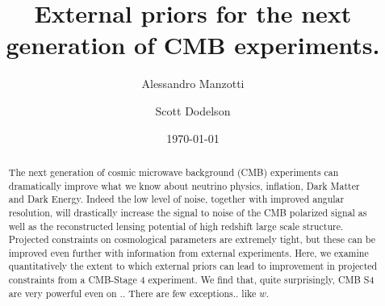 \documentclass[aps,prd,reprint,superscriptaddress]{revtex4-1}
\begin{document}
\graphicspath{{images/}}

\title{External priors for the next generation of CMB experiments.}

\author{Alessandro Manzotti}
\author{Scott Dodelson}


\date{\today}
\begin{abstract}
The next generation of cosmic microwave background (CMB) experiments can dramatically improve what we know about neutrino physics, inflation, Dark Matter and Dark Energy. 
Indeed the low level of noise, together with improved angular resolution, will drastically increase the signal to noise of the CMB polarized signal as well as the reconstructed lensing potential of high redshift large scale structure. 
Projected constraints on cosmological parameters are extremely tight, but these can be improved even further with information from external experiments. Here, we examine quantitatively the extent to which external priors can lead to improvement in projected constraints from a CMB-Stage 4 experiment.
We find that, quite surprisingly, CMB S4 are very powerful even on .. There are few exceptions.. like $w$.
\end{abstract}

\pacs{}
\maketitle
\end{document}
